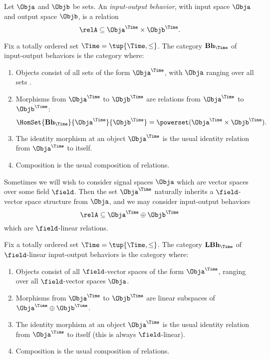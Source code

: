 \begin{definition}
    Let $\Obja$ and $\Objb$ be sets.
    An \emph{input-output behavior}, with input space $\Obja$ and output space $\Objb$, is a relation
    \begin{equation}
        \relA \subseteq \Obja^\Time \times \Objb^\Time.
    \end{equation}
\end{definition}

\begin{definition}
    Fix a totally ordered set $\Time = \tup{\Time, \leq}$.
    The category $\textbf{Bh}_\Time$ of input-output behaviors is the category where:
    \begin{enumerate}
        \item Objects consist of all sets of the form $\Obja^\Time$, with $\Obja$ ranging over all sets .
        \item Morphisms from $\Obja^\Time$ to $\Objb^\Time$ are relations from $\Obja^\Time$ to $\Objb^\Time$:
              \begin{equation}
                  \HomSet{\textbf{Bh}_\Time}{\Obja^\Time}{\Objb^\Time} = \powerset (\Obja^\Time \times \Objb^\Time).
              \end{equation}
        \item The identity morphism at an object $\Obja^\Time$ is the usual identity relation from $\Obja^\Time$ to itself.
        \item Composition is the usual composition of relations.
    \end{enumerate}
\end{definition}

Sometimes we will wish to consider signal spaces $\Obja$ which are vector spaces over some field $\field$.
Then the set $\Obja^\Time$ naturally inherits a $\field$-vector space structure from $\Obja$, and we may consider input-output behaviors
\begin{equation*}
    \relA \subseteq \Obja^\Time \oplus \Objb^\Time
\end{equation*}
which are $\field$-linear relations.

\begin{definition}
    Fix a totally ordered set $\Time = \tup{\Time, \leq}$.
    The category $\textbf{LBh}_\Time$ of $\field$-linear input-output behaviors is the category where:
    \begin{enumerate}
        \item Objects consist of all $\field$-vector spaces of the form $\Obja^\Time$, ranging over all $\field$-vector spaces $\Obja$.
        \item Morphisms from $\Obja^\Time$ to $\Objb^\Time$ are linear subspaces of  $\Obja^\Time \oplus \Objb^\Time$.
        \item The identity morphism at an object $\Obja^\Time$ is the usual identity relation from $\Obja^\Time$ to itself (this is always $\field$-linear).
        \item Composition is the usual composition of relations.
    \end{enumerate}
\end{definition}

